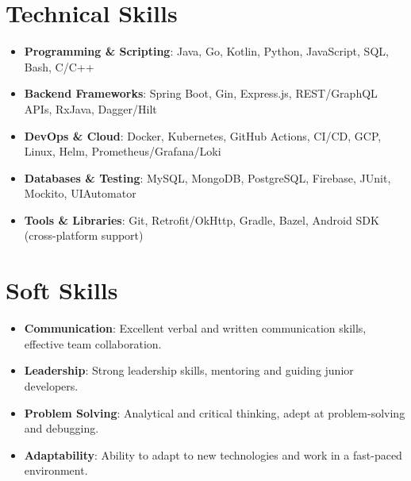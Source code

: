 \documentclass[letterpaper,1pt]{article}
\begin{document}
\section{Technical Skills}
\begin{itemize}[leftmargin=*, itemsep=1pt, parsep=0pt]
      \selectfont\small
      \setlength\itemsep{0em}
      \setlength\parsep{0em}
      \item \textbf{Programming \& Scripting}: \hspace{0.2cm}
            Java, Go, Kotlin, Python, JavaScript, SQL, Bash, C/C++
      \item \textbf{Backend Frameworks}: \hspace{1.0cm}
            Spring Boot, Gin, Express.js, REST/GraphQL APIs, RxJava, Dagger/Hilt
      \item \textbf{DevOps \& Cloud}: \hspace{1.65cm}
            Docker, Kubernetes, GitHub Actions, CI/CD, GCP, Linux, Helm, Prometheus/Grafana/Loki
      \item \textbf{Databases \& Testing}: \hspace{1.0cm}
            MySQL, MongoDB, PostgreSQL, Firebase, JUnit, Mockito, UIAutomator
      \item \textbf{Tools \& Libraries}: \hspace{1.55cm}
            Git, Retrofit/OkHttp, Gradle, Bazel, Android SDK (cross-platform support)
\end{itemize}

\vspace{-10pt}
\section{Soft Skills}
\begin{itemize}[leftmargin=*, itemsep=1pt, parsep=0pt]
      \selectfont\small
      \setlength\itemsep{0em}
      \setlength\parsep{0em}
      \item \textbf{Communication}: \hspace{0.65cm}
            Excellent verbal and written communication skills, effective team collaboration.
      \item \textbf{Leadership}: \hspace{1.45cm}
            Strong leadership skills, mentoring and guiding junior developers.
      \item \textbf{Problem Solving}: \hspace{0.45cm}
            Analytical and critical thinking, adept at problem-solving and debugging.
      \item \textbf{Adaptability}: \hspace{1.10cm}
            Ability to adapt to new technologies and work in a fast-paced environment.
\end{itemize}
\end{document}

